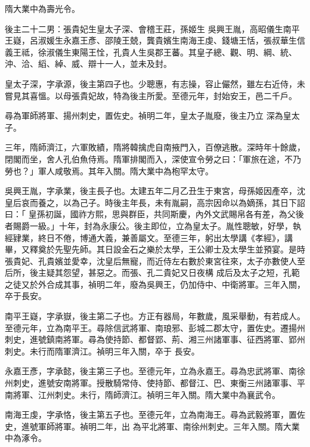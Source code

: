 \begin{pinyinscope}
 隋大業中為壽光令。



 後主二十二男：張貴妃生皇太子深、會稽王莊，孫姬生
 吳興王胤，高昭儀生南平王嶷，呂淑媛生永嘉王彥、邵陵王兢，龔貴嬪生南海王虔、錢塘王恬，張叔華生信義王祗，徐淑儀生東陽王恮，孔貴人生吳郡王蕃。其皇子總、觀、明、綱、統、沖、洽、縚、綽、威、辯十一人，並未及封。



 皇太子深，字承源，後主第四子也。少聰惠，有志操，容止儼然，雖左右近侍，未嘗見其喜慍。以母張貴妃故，特為後主所愛。至德元年，封始安王，邑二千戶。



 尋為軍師將軍、揚州刺史，置佐史。禎明二年，皇太子胤廢，後主乃立
 深為皇太子。



 三年，隋師濟江，六軍敗績，隋將韓擒虎自南掖門入，百僚逃散。深時年十餘歲，閉閣而坐，舍人孔伯魚侍焉。隋軍排閣而入，深使宣令勞之曰：「軍旅在途，不乃勞也？」軍人咸敬焉。其年入關。隋大業中為枹罕太守。



 吳興王胤，字承業，後主長子也。太建五年二月乙丑生于東宮，母孫姬因產卒，沈皇后哀而養之，以為己子。時後主年長，未有胤嗣，高宗因命以為嫡孫，其日下詔曰：「
 皇孫初誕，國祚方熙，思與群臣，共同斯慶，內外文武賜帛各有差，為父後者賜爵一級。」十年，封為永康公。後主即位，立為皇太子。胤性聰敏，好學，執經肄業，終日不倦，博通大義，兼善屬文。至德三年，躬出太學講《孝經》，講畢，又釋奠於先聖先師。其日設金石之樂於太學，王公卿士及太學生並預宴。是時張貴妃、孔貴嬪並愛幸，沈皇后無寵，而近侍左右數於東宮往來，太子亦數使人至后所，後主疑其怨望，甚惡之。而張、孔二貴妃又日夜構
 成后及太子之短，孔範之徒又於外合成其事，禎明二年，廢為吳興王，仍加侍中、中衛將軍。三年入關，卒于長安。



 南平王嶷，字承嶽，後主第二子也。方正有器局，年數歲，風采舉動，有若成人。至德元年，立為南平王。尋除信武將軍、南琅邪、彭城二郡太守，置佐史。遷揚州刺史，進號鎮南將軍。尋為使持節、都督郢、荊、湘三州諸軍事、征西將軍、郢州刺史。未行而隋軍濟江。禎明三年入關，卒于
 長安。



 永嘉王彥，字承懿，後主第三子也。至德元年，立為永嘉王。尋為忠武將軍、南徐州刺史，進號安南將軍。授散騎常侍、使持節、都督江、巴、東衡三州諸軍事、平南將軍、江州刺史。未行，隋師濟江。禎明三年入關。隋大業中為襄武令。



 南海王虔，字承恪，後主第五子也。至德元年，立為南海王。尋為武毅將軍，置佐史，進號軍師將軍。禎明二年，出
 為平北將軍、南徐州刺史。三年入關。隋大業中為涿令。




\end{pinyinscope}
